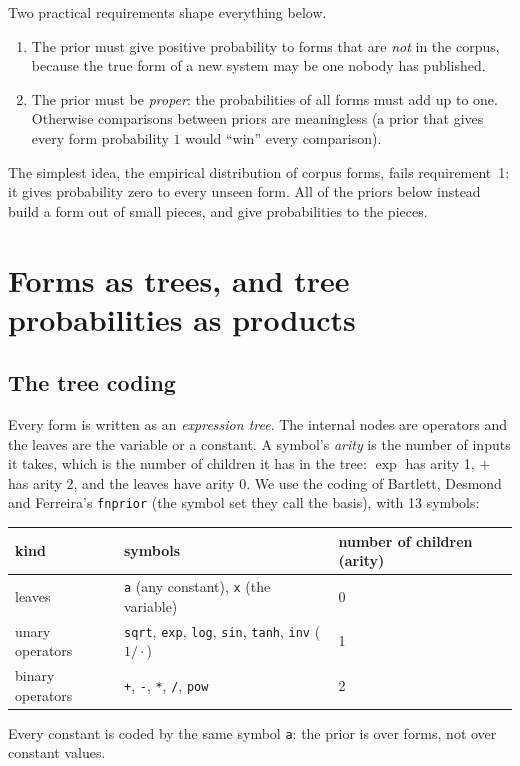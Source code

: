 \documentclass[11pt]{article}
\begin{document}
Two practical requirements shape everything below.
\begin{enumerate}
  \item The prior must give positive probability to forms that are \emph{not} in the corpus, because
  the true form of a new system may be one nobody has published.
  \item The prior must be \emph{proper}: the probabilities of all forms must add up to one. Otherwise
  comparisons between priors are meaningless (a prior that gives every form probability $1$ would ``win''
  every comparison).
\end{enumerate}
The simplest idea, the empirical distribution of corpus forms, fails requirement~1: it gives probability
zero to every unseen form. All of the priors below instead build a form out of small pieces, and give
probabilities to the pieces.

\section{Forms as trees, and tree probabilities as products}\label{sec:trees}

\subsection{The tree coding}

Every form is written as an \emph{expression tree}. The internal nodes are operators and the leaves are
the variable or a constant. A symbol's \emph{arity} is the number of inputs it takes, which is
the number of children it has in the tree: $\exp$ has arity 1, $+$ has arity 2, and the leaves have
arity 0. We use the coding of Bartlett, Desmond and Ferreira's \texttt{fnprior}
(the symbol set they call the basis), with 13 symbols:
\begin{center}
\begin{tabular}{lll}
  \toprule
  kind & symbols & number of children (arity)\\
  \midrule
  leaves & \texttt{a} (any constant), \texttt{x} (the variable) & 0\\
  unary operators & \texttt{sqrt}, \texttt{exp}, \texttt{log}, \texttt{sin}, \texttt{tanh}, \texttt{inv} ($1/\cdot$) & 1\\
  binary operators & \texttt{+}, \texttt{-}, \texttt{*}, \texttt{/}, \texttt{pow} & 2\\
  \bottomrule
\end{tabular}
\end{center}
Every constant is coded by the same symbol \texttt{a}: the prior is over forms, not over constant
values.
\end{document}

